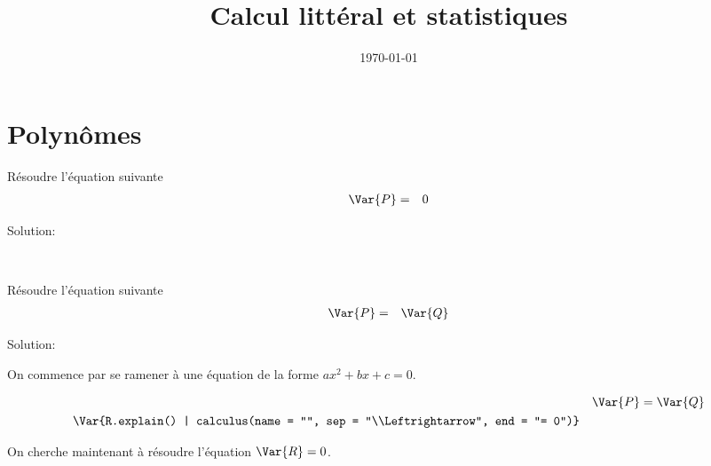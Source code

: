 \documentclass[a4paper,10pt]{article}
\title{Calcul littéral et statistiques}
\date{\today}
\begin{document}
\maketitle


\section{Polynômes}



    Résoudre l'équation suivante
    \begin{eqnarray*}
        \Var{P} & = & 0
    \end{eqnarray*}

    Solution:


    \bigskip
    ~\dotfill
    \bigskip
    
    
    Résoudre l'équation suivante
    \begin{eqnarray*}
        \Var{P} & = & \Var{Q}
    \end{eqnarray*}

    Solution:

    On commence par se ramener à une équation de la forme $ax^2+bx+c = 0$.


    \begin{align*}
         & & \Var{P} = \Var{Q} \\
        \Var{R.explain() | calculus(name = "", sep = "\\Leftrightarrow", end = "= 0")}
    \end{align*}

    On cherche maintenant à résoudre l'équation $\Var{R} = 0$.
    
\end{document}
